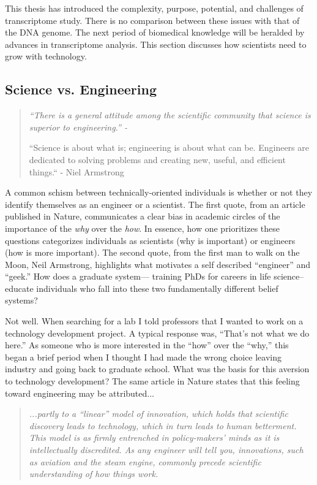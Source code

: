   This thesis has introduced the complexity, purpose, potential, and challenges of transcriptome study. There is no comparison between these issues with that of the DNA genome. The next period of biomedical knowledge will be heralded by advances in transcriptome analysis. This section discusses how scientists need to grow with technology.

  \subsection{Science vs. Engineering}
    \label{Disc:subsec:Science and Engineering}

    \begin{quote}
      \itshape 
      \singlespacing
        “There is a general attitude among the scientific community that science is superior to engineering.” - \citep{Macilwain2010}

      “Science is about what is; engineering is about what can be. Engineers are dedicated to solving problems and creating new, useful, and efficient things.“ - Niel Armstrong
      \end{quote}

    A common schism between technically-oriented individuals is whether or not they identify themselves as an engineer or a scientist. The first quote, from an article published in Nature, communicates a clear bias in academic circles of the importance of the \textit{why} over the \textit{how}. In essence, how one prioritizes these questions categorizes individuals as scientists (why is important) or engineers (how is more important). The second quote, from the first man to walk on the Moon, Neil Armstrong, highlights what motivates a self described ``engineer'' and ``geek.'' How does a graduate system--- training PhDs for careers in life science--educate individuals who fall into these two fundamentally different belief systems?

    Not well. When searching for a lab I told professors that I wanted to work on a technology development project. A typical response was, ``That's not what we do here.'' As someone who is more interested in the ``how'' over the ``why,'' this began a brief period when I thought I had made the wrong choice leaving industry and going back to graduate school. What was the basis for this aversion to technology development? The same article in Nature states that this feeling toward engineering may be attributed...

    \begin{quote} 
      \itshape 
      \singlespacing
      ...partly to a ``linear'' model of innovation, which holds that scientific discovery leads to technology, which in turn leads to human betterment. This model is as firmly entrenched in policy-makers' minds as it is intellectually discredited. As any engineer will tell you, innovations, such as aviation and the steam engine, commonly precede scientific understanding of how things work.
      \end{quote} 


